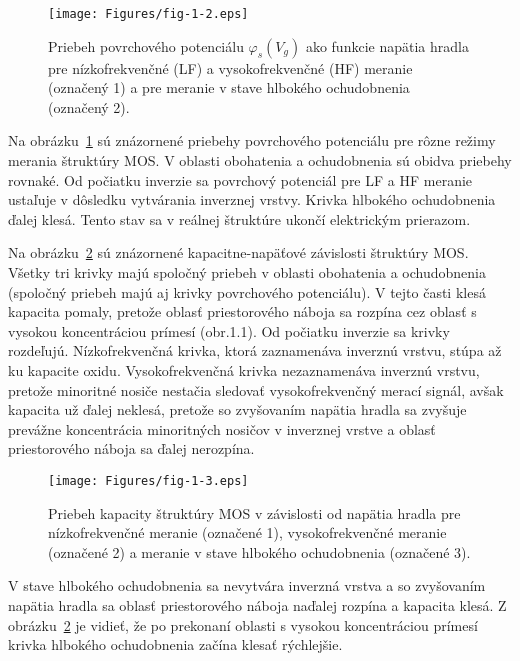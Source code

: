 \begin{figure}[h!]\centering
  \texttt{[image: Figures/fig-1-2.eps]}
  \caption[Priebeh povrchového potenciálu $\varphi_s(V_g)$ ako funkcie
    napätia hradla]{Priebeh povrchového potenciálu $\varphi_s(V_g)$
    ako funkcie napätia hradla pre nízkofrekvenčné (LF) a
    vysokofrekvenčné (HF) meranie (označený 1) a pre meranie v stave
    hlbokého ochudobnenia (označený 2).}\label{fig:1.2}
\end{figure}

\par Na obrázku~\ref{fig:1.2} sú znázornené priebehy povrchového
potenciálu pre rôzne režimy merania štruktúry MOS\@. V oblasti
obohatenia a ochudobnenia sú obidva priebehy rovnaké. Od počiatku
inverzie sa povrchový potenciál pre LF a HF meranie ustaľuje v
dôsledku vytvárania inverznej vrstvy.  Krivka hlbokého ochudobnenia
ďalej klesá. Tento stav sa v reálnej štruktúre ukončí elektrickým
prierazom.

\par Na obrázku~\ref{fig:1.3} sú znázornené kapacitne-napäťové
závislosti štruktúry MOS\@. Všetky tri krivky majú spoločný priebeh v
oblasti obohatenia a ochudobnenia (spoločný priebeh majú aj krivky
povrchového potenciálu). V tejto časti klesá kapacita pomaly, pretože
oblasť priestorového náboja sa rozpína cez oblasť s vysokou
koncentráciou prímesí (obr.1.1). Od počiatku inverzie sa krivky
rozdeľujú. Nízkofrekvenčná krivka, ktorá zaznamenáva inverznú vrstvu,
stúpa až ku kapacite oxidu. Vysokofrekvenčná krivka nezaznamenáva
inverznú vrstvu, pretože minoritné nosiče nestačia sledovať
vysokofrekvenčný merací signál, avšak kapacita už ďalej neklesá,
pretože so zvyšovaním napätia hradla sa zvyšuje prevážne koncentrácia
minoritných nosičov v inverznej vrstve a oblasť priestorového náboja
sa ďalej nerozpína.

\begin{figure}[h!]\centering
  \texttt{[image: Figures/fig-1-3.eps]}
  \caption[Priebeh kapacity štruktúry MOS v závislosti od napätia
    hradla]{Priebeh kapacity štruktúry MOS v závislosti od napätia
    hradla pre nízkofrekvenčné meranie (označené 1), vysokofrekvenčné
    meranie (označené 2) a meranie v stave hlbokého ochudobnenia
    (označené 3).}\label{fig:1.3}
\end{figure}

\par V stave hlbokého ochudobnenia sa nevytvára inverzná vrstva a so
zvyšovaním napätia hradla sa oblasť priestorového náboja naďalej
rozpína a kapacita klesá. Z obrázku~\ref{fig:1.3} je vidieť, že po
prekonaní oblasti s vysokou koncentráciou prímesí krivka hlbokého
ochudobnenia začína klesať rýchlejšie.

